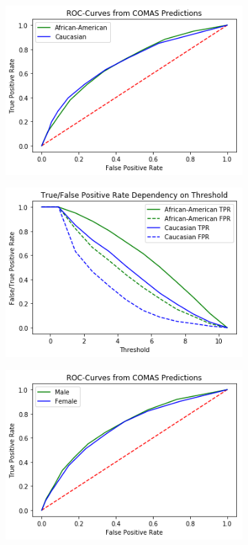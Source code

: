 \documentclass[11pt, fleqn, titlepage]{article}
\begin{document}
	\begin{figure}[H]
		\centering
		\begin{subfigure}{0.5\textwidth}
			\centering
			\includegraphics[width=0.9\linewidth]{imgs/propub_ROC_race.png}
		\end{subfigure}%
		\begin{subfigure}{0.5\textwidth}
			\centering
			\includegraphics[width=0.9\linewidth]{imgs/propub_fpr_tpr_race.png}
		\end{subfigure}
		\begin{subfigure}{0.5\textwidth}
			\centering
			\includegraphics[width=0.9\linewidth]{imgs/propub_ROC_sex.png}

\end{subfigure}
\end{figure}
\end{document}
